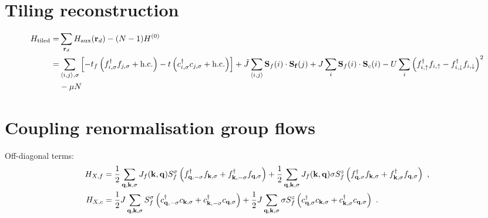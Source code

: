 \documentclass[%
reprint,
superscriptaddress,
groupedaddress,
superscriptaddress,
onecolumn,
]{revtex4-2}
\begin{document}
\section{Tiling reconstruction}
\begin{equation}\begin{aligned}
	H_\text{tiled} =& \sum_{{\bf r}_d}H_\text{aux}({\bf r}_d) - (N-1) H^{(0)} \\
	=& \sum_{\braket{i,j},\sigma}\left[-t_f\left(f^\dagger_{i,\sigma}f_{j,\sigma} + \text{h.c.}\right) -t\left(c^\dagger_{i,\sigma}c_{j,\sigma} + \text{h.c.}\right)\right] + \tilde J \sum_{\braket{i,j}}{\bf S}_f(i) \cdot {\bf S_f}(j) + J\sum_i {\bf S}_f(i)\cdot {\bf S}_c(i) - U\sum_i \left(f^\dagger_{i,\uparrow}f_{i,\uparrow} - f^\dagger_{i,\downarrow}f_{i,\downarrow}\right)^2 \\
	 &- \mu N
\end{aligned}\end{equation}

\section{Coupling renormalisation group flows}
Off-diagonal terms:
\begin{equation}\begin{aligned}
	H_{X, f} &= \frac{1}{2}\sum_{{\bf q},{\bf k},\sigma}J_f({\bf k},{\bf q}) S_f^\sigma \left(f^\dagger_{{\bf q},-\sigma}f_{{\bf k},\sigma} + f^\dagger_{{\bf k},-\sigma}f_{{\bf q},\sigma}\right) + \frac{1}{2}\sum_{{\bf q},{\bf k},\sigma}J_f({\bf k},{\bf q}) \sigma S_f^z \left(f^\dagger_{{\bf q},\sigma}f_{{\bf k},\sigma} + f^\dagger_{{\bf k},\sigma}f_{{\bf q},\sigma}\right)~,\\
	H_{X, c} &= \frac{1}{2}J\sum_{{\bf q},{\bf k},\sigma} S_f^\sigma \left(c^\dagger_{{\bf q},-\sigma}c_{{\bf k},\sigma} + c^\dagger_{{\bf k},-\sigma}c_{{\bf q},\sigma}\right) + \frac{1}{2}J\sum_{{\bf q},{\bf k},\sigma} \sigma S_f^z \left(c^\dagger_{{\bf q},\sigma}c_{{\bf k},\sigma} + c^\dagger_{{\bf k},\sigma}c_{{\bf q},\sigma}\right)~.
\end{aligned}\end{equation}
\end{document}
